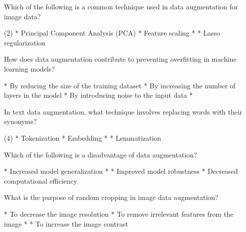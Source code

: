 \documentclass[11pt]{extarticle}
\begin{document}
\begin{exercise}
    Which of the following is a common technique used in data augmentation for image data?
    \begin{choice} (2)
        * Principal Component Analysis (PCA)
        * Feature scaling
        * 
        * Lasso regularization
    \end{choice}
\end{exercise}
\begin{solution}
\end{solution}


\begin{exercise}
    How does data augmentation contribute to preventing overfitting in machine learning models?
    \begin{choice}
        * By reducing the size of the training dataset
        * By increasing the number of layers in the model
        * By introducing noise to the input data
        * 
    \end{choice}
\end{exercise}
\begin{solution}
\end{solution}

\begin{exercise}
    In text data augmentation, what technique involves replacing words with their synonyms?
    \begin{choice}(4)
        * Tokenization
        * Embedding
        * 
        * Lemmatization
    \end{choice}
\end{exercise}
\begin{solution}
\end{solution}

\begin{exercise}
    Which of the following is a disadvantage of data augmentation?
    \begin{choice}
        * Increased model generalization
        * 
        * Improved model robustness
        * Decreased computational efficiency
    \end{choice}
\end{exercise}
\begin{solution}
\end{solution}

\begin{exercise}
    What is the purpose of random cropping in image data augmentation?
    \begin{choice}
        * To decrease the image resolution
        * To remove irrelevant features from the image
        * 
        * To increase the image contrast
    \end{choice}
\end{exercise}
\begin{solution}
\end{solution}
\end{document}
